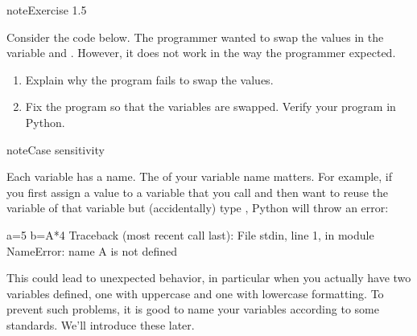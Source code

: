 \documentclass[letterpaper,10pt,english]{jupyterBook}
\begin{document}
\begin{sphinxadmonition}{note}{Exercise 1.5}

\sphinxAtStartPar
Consider the code below. The programmer wanted to swap the values in the variable  and . However, it does not work in the way the programmer expected.
\begin{enumerate}
%
\item {} 
\sphinxAtStartPar
Explain why the program fails to swap the values.

\item {} 
\sphinxAtStartPar
Fix the program so that the variables are swapped. Verify your program in Python.

\end{enumerate}

\begin{sphinxVerbatim}[commandchars=\\\{\}]
  
  
  
  
\end{sphinxVerbatim}
\end{sphinxadmonition}

\begin{sphinxadmonition}{note}{Case sensitivity}

\sphinxAtStartPar
Each variable has a name. The  of your variable name matters. For example, if you first assign a value to a variable that you call  and then want to reuse the variable of that variable but (accidentally) type , Python will throw an error:

\begin{sphinxVerbatim}[commandchars=\\\{\}]
\PYGZgt{}\PYGZgt{}\PYGZgt{} a=5
\PYGZgt{}\PYGZgt{}\PYGZgt{} b=A*4
Traceback (most recent call last):
  File \PYGZdq{}\PYGZlt{}stdin\PYGZgt{}\PYGZdq{}, line 1, in \PYGZlt{}module\PYGZgt{}
NameError: name \PYGZsq{}A\PYGZsq{} is not defined
\end{sphinxVerbatim}

\sphinxAtStartPar
This could lead to unexpected behavior, in particular when you actually have two variables defined, one with uppercase and one with lowercase formatting. To prevent such problems, it is good to name your variables according to some standards. We’ll introduce these later.
\end{sphinxadmonition}
\end{document}

